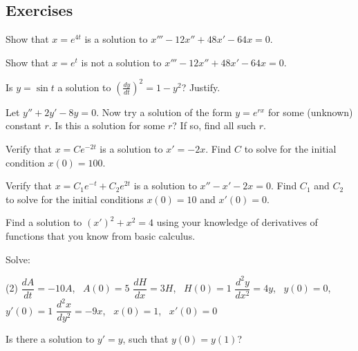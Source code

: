 \subsection{Exercises}

\begin{exercise}
Show that $x = e^{4t}$ is a solution to $x'''-12 x'' + 48 x' - 64 x = 0$.
\end{exercise}

\begin{exercise}
Show that $x = e^{t}$ is not a solution to $x'''-12 x'' + 48 x' - 64 x = 0$.
\end{exercise}

\begin{exercise}
Is $y = \sin t$ a solution to ${\left( \frac{dy}{dt} \right)}^2 = 1 - y^2$?
Justify.
\end{exercise}

\begin{exercise}
Let $y'' + 2y' - 8y = 0$.  Now try a solution of the form $y = e^{rx}$ for
some (unknown) constant $r$.  Is this a solution
for some $r$?  If so, find all such $r$.
\end{exercise}

\begin{exercise}
Verify that $x = C e^{-2t}$ is a solution to $x' = -2x$.
Find $C$ to solve for the initial condition $x(0) = 100$.
\end{exercise}

\begin{exercise}
Verify that $x = C_1 e^{-t} + C_2 e^{2t}$ is a solution to $x'' - x' -2 x =
0$.  Find $C_1$ and $C_2$ to solve for the initial conditions $x(0) = 10$
and $x'(0) = 0$.
\end{exercise}

\begin{exercise}
Find a solution to
${(x')}^2 + x^2 = 4$
using your knowledge of derivatives of functions that you
know from basic calculus.
\end{exercise}

\begin{exercise}
Solve:
\begin{tasks}(2)
\task $\dfrac{dA}{dt} = -10 A$,~ $A(0)=5$
\task $\dfrac{dH}{dx} = 3 H$,~ $H(0)=1$
\task $\dfrac{d^2y}{dx^2} = 4 y$,~ $y(0)=0$,~ $y'(0)=1$
\task $\dfrac{d^2x}{dy^2} = -9 x$,~ $x(0)=1$,~ $x'(0)=0$
\end{tasks}
\end{exercise}

\begin{exercise}
Is there a solution to $y' = y$, such that $y(0) = y(1)$?
\end{exercise}

